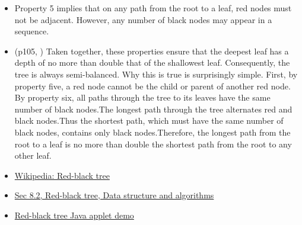 \begin{itemize}
\item Property 5 implies that on any path from the root to a leaf, red nodes must not be
  adjacent.  However, any number of black nodes may appear in a sequence.
\item (p105, \cite{love2010linux}) Taken together, these properties ensure that the
  deepest leaf has a depth of no more than double that of the shallowest
  leaf. Consequently, the tree is always semi-balanced. Why this is true is surprisingly
  simple. First, by property five, a red node cannot be the child or parent of another red
  node. By property six, all paths through the tree to its leaves have the same number of
  black nodes.The longest path through the tree alternates red and black nodes.Thus the
  shortest path, which must have the same number of black nodes, contains only black
  nodes.Therefore, the longest path from the root to a leaf is no more than double the
  shortest path from the root to any other leaf.
\item \href{http://en.wikipedia.org/wiki/Red-black_tree}{Wikipedia: Red-black tree}
\item \href{http://www.cs.auckland.ac.nz/~jmor159/PLDS210/red_black.html}{Sec 8.2,
    Red-black tree, Data structure and algorithms}
\item \href{http://www.ece.uc.edu/~franco/C321/html/RedBlack/redblack.html}{Red-black tree
  Java applet demo}
\end{itemize}

